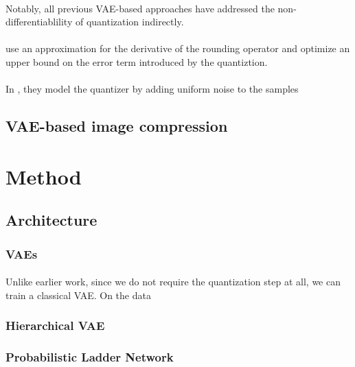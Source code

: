 \documentclass{article}
\begin{document}
\paragraph{}
Notably, all previous VAE-based approaches have addressed the
non-differentiablility of quantization indirectly.
\paragraph{}
\cite{theis2017lossy} use an approximation for the derivative of the rounding
operator and optimize an upper bound on the error term introduced by the
quantiztion.
\paragraph{}
In \cite{balle2016end},\cite{balle2018variational} they model the quantizer by
adding uniform noise to the samples 
\subsection{VAE-based image compression}
\section{Method}

\subsection{Architecture}
\subsubsection{VAEs}
\paragraph{}
Unlike earlier work, since we do not require the quantization step at all, we
can train a classical VAE. On the data

\subsubsection{Hierarchical VAE}
\paragraph{}

\subsubsection{Probabilistic Ladder Network}
\end{document}
